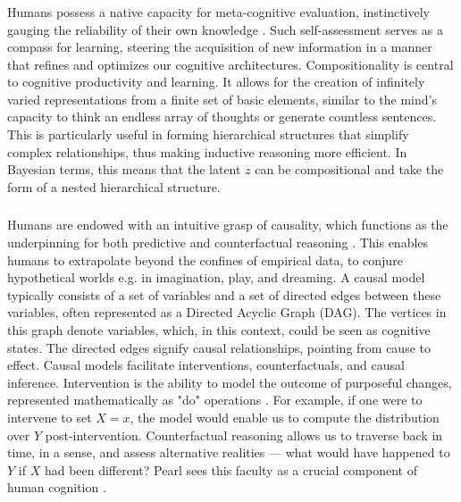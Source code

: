 \subsubsection{}
Humans possess a native capacity for meta-cognitive evaluation, instinctively gauging the reliability of their own knowledge \cite{Lake_Ullman_Tenenbaum_Gershman_2017}. Such self-assessment serves as a compass for learning, steering the acquisition of new information in a manner that refines and optimizes our cognitive architectures.
Compositionality is central to cognitive productivity and learning. It allows for the creation of infinitely varied representations from a finite set of basic elements, similar to the mind's capacity to think an endless array of thoughts or generate countless sentences. This is particularly useful in forming hierarchical structures that simplify complex relationships, thus making inductive reasoning more efficient.
In Bayesian terms, this means that the latent $z$ can be compositional and take the form of a nested hierarchical structure.




\subsubsection{}
Humans are endowed with an intuitive grasp of causality, which functions as the underpinning for both predictive and counterfactual reasoning \cite{Lake_Ullman_Tenenbaum_Gershman_2017}. This enables humans to extrapolate beyond the confines of empirical data, to conjure hypothetical worlds e.g. in imagination, play, and dreaming.
A causal model typically consists of a set of variables and a set of directed edges between these variables, often represented as a Directed Acyclic Graph (DAG). The vertices in this graph denote variables, which, in this context, could be seen as cognitive states. The directed edges signify causal relationships, pointing from cause to effect.
Causal models facilitate interventions, counterfactuals, and causal inference. Intervention is the ability to model the outcome of purposeful changes, represented mathematically as "do" operations  \cite{Pearl_2018}. For example, if one were to intervene to set $X = x$, the model would enable us to compute the distribution over $Y$ post-intervention.
Counterfactual reasoning allows us to traverse back in time, in a sense, and assess alternative realities — what would have happened to $Y$ if $X$ had been different?
Pearl sees this faculty as a crucial component of human cognition \cite{Pearl_2018}.

